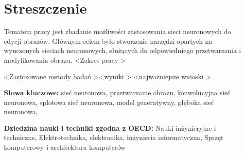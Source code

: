 \section*{Streszczenie}

  Tematem pracy jest zbadanie możliwości zastosowania sieci neuronowych do
  edycji obrazów. Głównym celem było stworzenie narzędzi opartych na wyuczonych
  sieciach neuronowych, służących do odpowiedniego przetwarzania i
  modyfikowania obrazu. \textless Zakres pracy \textgreater

  \textless Zastosowane metody badań \textgreater \textless wyniki \textgreater
  \textless najważniejsze wnioski \textgreater

  \bigskip

  \noindent\textbf{Słowa kluczowe:} sieć neuronowa, przetwarzanie obrazu,
  konwolucyjna sieć neuronowa, splotowa sieć neuronowa, model generatywny,
  głęboka sieć neuronowa,

  \bigskip

  \noindent\textbf{Dziedzina nauki i techniki zgodna z OECD:} Nauki
  inżynieryjne i techniczne, Elektrotechnika, elektronika, inżynieria
  informatyczna, Sprzęt komputerowy i architektura komputerów
